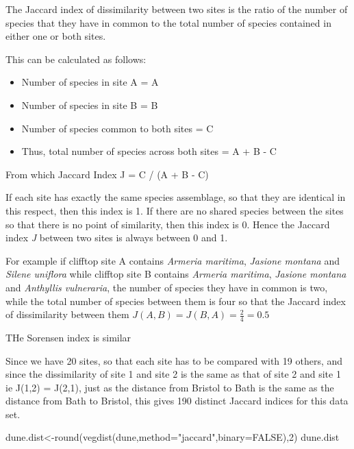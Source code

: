\documentclass[
  letterpaper,
  DIV=11,
  numbers=noendperiod]{scrreprt}
\newenvironment{Shaded}{\begin{snugshade}}{\end{snugshade}}
\newcommand{\AttributeTok}[1]{\textcolor[rgb]{0.40,0.45,0.13}{#1}}
\newcommand{\ConstantTok}[1]{\textcolor[rgb]{0.56,0.35,0.01}{#1}}
\newcommand{\DecValTok}[1]{\textcolor[rgb]{0.68,0.00,0.00}{#1}}
\newcommand{\FunctionTok}[1]{\textcolor[rgb]{0.28,0.35,0.67}{#1}}
\newcommand{\NormalTok}[1]{\textcolor[rgb]{0.00,0.23,0.31}{#1}}
\newcommand{\OtherTok}[1]{\textcolor[rgb]{0.00,0.23,0.31}{#1}}
\newcommand{\StringTok}[1]{\textcolor[rgb]{0.13,0.47,0.30}{#1}}
\providecommand{\tightlist}{%
  \setlength{\itemsep}{0pt}\setlength{\parskip}{0pt}}\usepackage{longtable,booktabs,array}
\begin{document}
The Jaccard index of dissimilarity between two sites is the ratio of the
number of species that they have in common to the total number of
species contained in either one or both sites.

This can be calculated as follows:

\begin{itemize}
\tightlist
\item
  Number of species in site A = A
\item
  Number of species in site B = B
\item
  Number of species common to both sites = C
\item
  Thus, total number of species across both sites = A + B - C
\end{itemize}

From which Jaccard Index J = C / (A + B - C)

If each site has exactly the same species assemblage, so that they are
identical in this respect, then this index is 1. If there are no shared
species between the sites so that there is no point of similarity, then
this index is 0. Hence the Jaccard index \emph{J} between two sites is
always between 0 and 1.

For example if clifftop site A contains \emph{Armeria maritima},
\emph{Jasione montana} and \emph{Silene uniflora} while clifftop site B
contains \emph{Armeria maritima}, \emph{Jasione montana} and
\emph{Anthyllis vulneraria}, the number of species they have in common
is two, while the total number of species between them is four so that
the Jaccard index of dissimilarity between them
\(J(A,B) = J(B,A) = \frac{2}{4}= 0.5\)

THe Sorensen index is similar

Since we have 20 sites, so that each site has to be compared with 19
others, and since the dissimilarity of site 1 and site 2 is the same as
that of site 2 and site 1 ie J(1,2) = J(2,1), just as the distance from
Bristol to Bath is the same as the distance from Bath to Bristol, this
gives 190 distinct Jaccard indices for this data set.

\begin{Shaded}
\begin{Highlighting}[]
\NormalTok{dune.dist}\OtherTok{\textless{}{-}}\FunctionTok{round}\NormalTok{(}\FunctionTok{vegdist}\NormalTok{(dune,}\AttributeTok{method=}\StringTok{"jaccard"}\NormalTok{,}\AttributeTok{binary=}\ConstantTok{FALSE}\NormalTok{),}\DecValTok{2}\NormalTok{)}
\NormalTok{dune.dist}
\end{Highlighting}
\end{Shaded}
\end{document}
